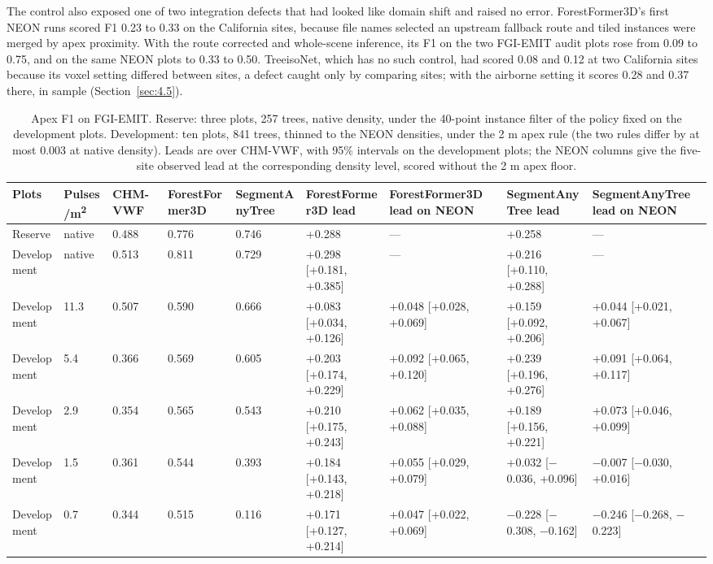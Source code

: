 \documentclass[preprint,12pt,authoryear,a4paper]{elsarticle}
\begin{document}
The control also exposed one of two integration defects that had looked like
domain shift and raised no error. ForestFormer3D's first NEON runs scored F1
0.23 to 0.33 on the California sites, because file names selected an upstream
fallback route and tiled instances were merged by apex proximity. With the route
corrected and whole-scene inference, its F1 on the two FGI-EMIT audit plots rose
from 0.09 to 0.75, and on the same NEON plots to 0.33 to 0.50. TreeisoNet, which
has no such control, had scored 0.08 and 0.12 at two California sites because
its voxel setting differed between sites, a defect caught only by comparing
sites; with the airborne setting it scores 0.28 and 0.37 there, in sample
(Section~\ref{sec:4.5}).

\begin{table}
\centering
{\footnotesize
\setlength{\tabcolsep}{3pt}
\renewcommand{\arraystretch}{1.15}
\begin{tabularx}{\linewidth}{lllLLLLLL}
\toprule
Plots & Pulses/m\textsuperscript{2} & CHM-VWF & ForestFormer3D & SegmentAnyTree & ForestFormer3D lead & ForestFormer3D lead on NEON & SegmentAnyTree lead & SegmentAnyTree lead on NEON \\
\midrule
Reserve & native & 0.488 & 0.776 & 0.746 & +0.288 & --- & +0.258 & --- \\
Development & native & 0.513 & 0.811 & 0.729 & +0.298 [+0.181, +0.385] & --- & +0.216 [+0.110, +0.288] & --- \\
Development & 11.3 & 0.507 & 0.590 & 0.666 & +0.083 [+0.034, +0.126] & +0.048 [+0.028, +0.069] & +0.159 [+0.092, +0.206] & +0.044 [+0.021, +0.067] \\
Development & 5.4 & 0.366 & 0.569 & 0.605 & +0.203 [+0.174, +0.229] & +0.092 [+0.065, +0.120] & +0.239 [+0.196, +0.276] & +0.091 [+0.064, +0.117] \\
Development & 2.9 & 0.354 & 0.565 & 0.543 & +0.210 [+0.175, +0.243] & +0.062 [+0.035, +0.088] & +0.189 [+0.156, +0.221] & +0.073 [+0.046, +0.099] \\
Development & 1.5 & 0.361 & 0.544 & 0.393 & +0.184 [+0.143, +0.218] & +0.055 [+0.029, +0.079] & +0.032 [$-$0.036, +0.096] & $-$0.007 [$-$0.030, +0.016] \\
Development & 0.7 & 0.344 & 0.515 & 0.116 & +0.171 [+0.127, +0.214] & +0.047 [+0.022, +0.069] & $-$0.228 [$-$0.308, $-$0.162] & $-$0.246 [$-$0.268, $-$0.223] \\
\bottomrule
\end{tabularx}
}
\caption{Apex F1 on FGI-EMIT. Reserve: three plots, 257 trees, native
density, under the 40-point instance filter of the policy fixed on the
development plots. Development: ten plots, 841 trees, thinned to the NEON
densities, under the 2 m apex rule (the two rules differ by at most 0.003 at
native density). Leads are over CHM-VWF, with 95\% intervals on the development
plots; the NEON columns give the five-site observed lead at the corresponding
density level, scored without the 2 m apex floor.}
\label{tab:6}
\end{table}
\end{document}
